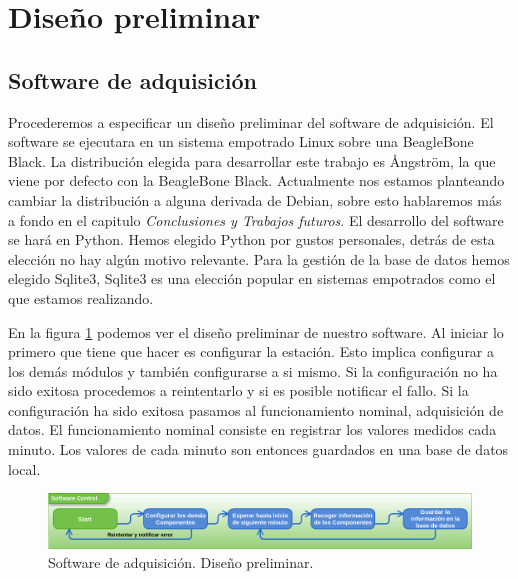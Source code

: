 \section{Diseño preliminar}
	\subsection{Software de adquisición}
		Procederemos a especificar un diseño preliminar del software de adquisición. El software se ejecutara en un sistema empotrado Linux sobre
		una BeagleBone Black. La distribución elegida para desarrollar este trabajo es Ångström, la que viene por defecto con la BeagleBone
		Black. Actualmente nos estamos planteando cambiar la distribución a alguna derivada de Debian, sobre esto hablaremos más a fondo en el
		capitulo \emph{Conclusiones y Trabajos futuros}. El desarrollo del software se hará en Python. Hemos elegido Python por gustos
		personales, detrás de esta elección no hay algún motivo relevante. Para la gestión de la base de datos hemos elegido Sqlite3,
		Sqlite3 es una elección popular en sistemas empotrados como el que estamos realizando. 
		\par
		En la figura \ref{fig:soft_control_preliminar} podemos ver el diseño preliminar de nuestro software. Al iniciar lo primero que 
		tiene que hacer es configurar la estación. Esto implica configurar a los demás módulos y también configurarse a si mismo. Si la
		configuración no ha sido exitosa procedemos a reintentarlo y si es posible notificar el fallo. Si la configuración ha sido exitosa pasamos al
		funcionamiento nominal, adquisición de datos. El funcionamiento nominal consiste en registrar los valores medidos cada minuto. Los
		valores de cada minuto son entonces guardados en una base de datos local.
		\begin{figure}[h]
			\centering
			\includegraphics[keepaspectratio, width=1\textwidth]{./img/soft_control_preliminar.png}
			\caption{Software de adquisición. Diseño preliminar.}
			\label{fig:soft_control_preliminar}
		\end{figure}
